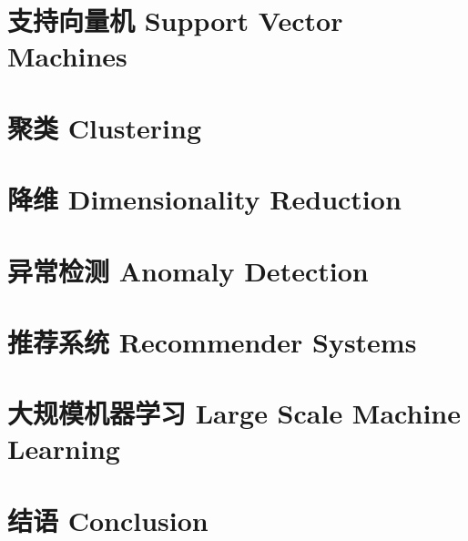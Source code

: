 \documentclass[12pt, a4paper]{article}
\begin{document}
\section{支持向量机 Support Vector Machines}

\section{聚类 Clustering}

\section{降维 Dimensionality Reduction}

\section{异常检测 Anomaly Detection}

\section{推荐系统 Recommender Systems}

\section{大规模机器学习 Large Scale Machine Learning}

\section{结语 Conclusion}
\end{document}
